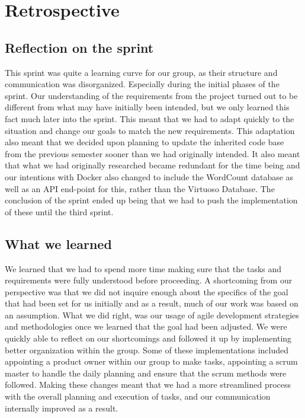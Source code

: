 \section{Retrospective}

\subsection{Reflection on the sprint}
This sprint was quite a learning curve for our group, as their structure and communication was disorganized. Especially during the initial phases of the sprint. Our understanding of the requirements from the \knox{} project turned out to be different from what may have initially been intended, but we only learned this fact much later into the sprint. This meant that we had to adapt quickly to the situation and change our goals to match the new requirements. This adaptation also meant that we decided upon planning to update the inherited code base from the previous semester sooner than we had originally intended. It also meant that what we had originally researched became redundant for the time being and our intentions with Docker also changed to include the WordCount database as well as an API end-point for this, rather than the Virtuoso Database. The conclusion of the sprint ended up being that we had to push the implementation of these until the third sprint.

\subsection{What we learned}
We learned that we had to spend more time making sure that the tasks and requirements were fully understood before proceeding. A shortcoming from our perspective was that we did not inquire enough about the specifics of the goal that had been set for us initially and as a result, much of our work was based on an assumption. 
What we did right, was our usage of agile development strategies and methodologies once we learned that the goal had been adjusted. We were quickly able to reflect on our shortcomings and followed it up by implementing better organization within the group. Some of these implementations included appointing a product owner within our group to make tasks, appointing a scrum master to handle the daily planning and ensure that the scrum methods were followed. Making these changes meant that we had a more streamlined process with the overall planning and execution of tasks, and our communication internally improved as a result.

